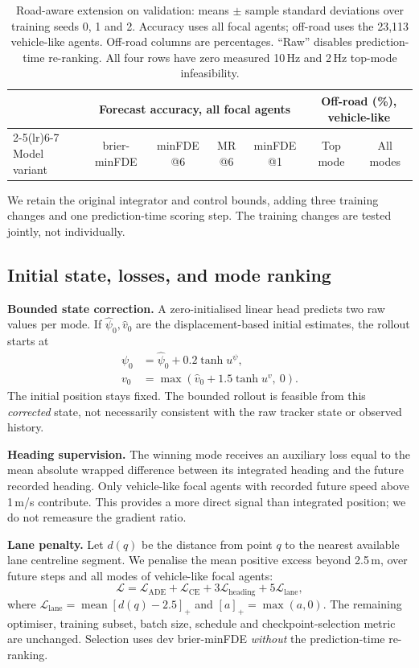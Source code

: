 \documentclass[conference]{IEEEtran}
\begin{document}
\begin{table}[t]
\centering
\caption{Road-aware extension on validation: means $\pm$ sample standard deviations over training
seeds 0, 1 and 2. Accuracy uses all focal agents; off-road uses the 23,113 vehicle-like agents.
Off-road columns are percentages. ``Raw'' disables prediction-time re-ranking. All four rows
have zero measured 10\,Hz and 2\,Hz top-mode infeasibility.}
\label{tab:roadmeans}
\small
\setlength{\tabcolsep}{3.5pt}
\begin{tabular}{lcccccc}
\toprule
& \multicolumn{4}{c}{Forecast accuracy, all focal agents}
& \multicolumn{2}{c}{Off-road (\%), vehicle-like} \\
\cmidrule(lr){2-5}\cmidrule(lr){6-7}
Model variant & brier-minFDE & minFDE @6 & MR @6 & minFDE @1 & Top mode & All modes \\
\midrule

\end{tabular}
\end{table}

We retain the original integrator and control bounds, adding three training changes and one
prediction-time scoring step. The training changes are tested jointly, not individually.

\subsection{Initial state, losses, and mode ranking}
\textbf{Bounded state correction.} A zero-initialised linear head predicts two raw values per mode.
If $\hat\psi_0,\hat v_0$ are the displacement-based initial estimates, the rollout starts at
\begin{align}
\psi_0 &= \hat\psi_0 + 0.2\tanh u^{\psi}, \\
v_0 &= \max(\hat v_0 + 1.5\tanh u^v,\ 0).
\end{align}
The initial position stays fixed. The bounded rollout is feasible from this \emph{corrected}
state, not necessarily consistent with the raw tracker state or observed history.

\textbf{Heading supervision.} The winning mode receives an auxiliary loss equal to the mean
absolute wrapped difference between its integrated heading and the future recorded heading. Only
vehicle-like focal agents with recorded future speed above 1\,m/s contribute. This provides a more direct signal than integrated position; we do not remeasure the gradient ratio.

\textbf{Lane penalty.} Let $d(q)$ be the distance from point $q$ to the nearest available lane
centreline segment. We penalise the mean positive excess beyond 2.5\,m, over future steps and all
modes of vehicle-like focal agents:
\begin{equation}
\mathcal L = \mathcal L_{\mathrm{ADE}} + \mathcal L_{\mathrm{CE}}
             + 3\mathcal L_{\mathrm{heading}} + 5\mathcal L_{\mathrm{lane}},
\end{equation}
where $\mathcal L_{\mathrm{lane}}=\operatorname{mean}[d(q)-2.5]_+$ and $[a]_+=\max(a,0)$.
The remaining optimiser, training subset, batch size, schedule and checkpoint-selection metric are
unchanged. Selection uses dev brier-minFDE \emph{without} the prediction-time re-ranking.
\end{document}
